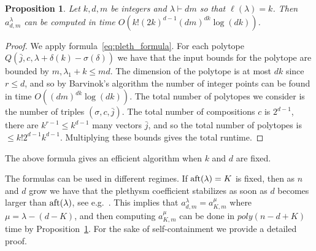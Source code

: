\documentclass[11pt]{amsart}
\newtheorem{prop}[thm]{Proposition}
\theoremstyle{plain}
\theoremstyle{definition}
\numberwithin{equation}{section}
\newcommand{\la}{\lambda}
\newcommand{\poly}{poly}
\def\la{\lambda}
\begin{document}
\begin{prop}\label{prop:pleth_gen}
Let $k,d,m$ be integers and $\lambda \vdash dm$ so that $\ell(\la)=k$. Then $a^\la_{d,m}$ can be computed in time $O(k! (2k)^{d-1} (dm)^{dk}\log(dk))$.  
\end{prop}
\begin{proof}
We apply formula~\eqref{eq:pleth_formula}. For each polytope $Q(\bar{j},c,\la+\delta(k) - \sigma(\delta))$ we have that the input bounds for the polytope are bounded by $m, \la_1+k \leq md$. The dimension of the polytope is at most $dk$ since $r \leq d$, and so by Barvinok's algorithm the number of integer points can be found in time $O((dm)^{dk}\log(dk))$. The total number of polytopes we consider  is the number of triples $(\sigma, c, \bar{j})$. The total number of compositions $c$ is $2^{d-1}$, there are  $k^{r-1} \leq k^{d-1}$ many vectors $\bar{j}$, and so the total number of polytopes is $\leq k! 2^{d-1} k^{d-1}$. Multiplying these bounds gives the total runtime. 
\end{proof}

The above formula gives an efficient algorithm when $k$ and $d$ are fixed.



The formulas can be used in different regimes. If ${\rm aft}(\la)=K$ is fixed, then as $n$ and $d$ grow we have that the plethysm coefficient stabilizes as soon as $d$ becomes larger than ${\rm aft}(\la)$, see e.g.~\cite{brion1993stable,colmenarejo2017stability}. This implies that $a^\la_{d,m} = a^\mu_{K,m}$ where $\mu = \la -(d-K)$, and then computing $a^\mu_{K,m}$ can be done in $\poly(n-d+K)$ time by Proposition~\ref{prop:pleth_gen}. For the sake of self-containment we provide a detailed proof.
\end{document}
